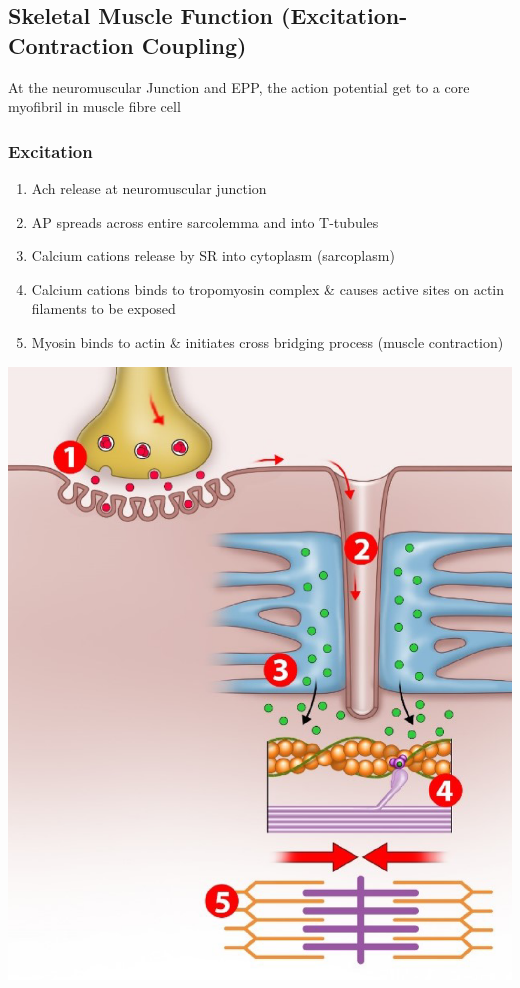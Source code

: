 \documentclass[11pt,fleqn]{book}
\begin{document}
\subsection{Skeletal Muscle Function (Excitation-Contraction Coupling)}
At the neuromuscular Junction and EPP, the action potential get to a core myofibril in muscle fibre cell 

\subsubsection{Excitation}
\begin{enumerate}
    \item Ach release at neuromuscular junction
    \item AP spreads across
entire sarcolemma and
into T-tubules
    \item Calcium cations release by SR into
cytoplasm (sarcoplasm)
    \item Calcium cations binds to
tropomyosin complex
\& causes active sites on
actin filaments to be
exposed
    \item Myosin binds to actin \&
initiates cross bridging
process (muscle
contraction)
\end{enumerate}
\begin{center}
    \includegraphics[width=0.7\linewidth]{Pictures/Screenshot 2024-04-03 223557.png}
\end{center}
\end{document}
